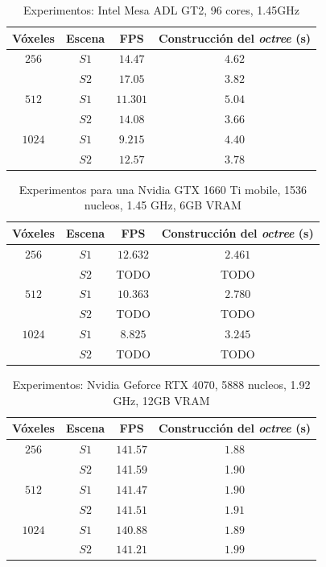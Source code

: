 \begin{table}[ht]
\centering
\begin{tabular}{|c|c|c|c|}
	\hline
	\textbf{Vóxeles} & \textbf{Escena} & \textbf{FPS} & \textbf{Construcción del \textit{octree} (s)} \\
	\hline
	$256$ & $S1$ & $14.47$ & $4.62$ \\
	 & $S2$ & $17.05$ & $3.82$ \\
	\hline
	$512$ & $S1$ & $11.301$ & $5.04$ \\
	 & $S2$ & $14.08$ & $3.66$ \\
	\hline
	$1024$ & $S1$ & $9.215$ & $4.40$ \\
	 & $S2$ & $12.57$ & $3.78$ \\
	\hline
\end{tabular}
\caption{Experimentos: Intel Mesa ADL GT2, 96 cores, 1.45GHz}
\label{tab:cisco-laptop}
\end{table}

\begin{table}[hb]
\centering
\begin{tabular}{|c|c|c|c|}
	\hline
	\textbf{Vóxeles} & \textbf{Escena} & \textbf{FPS} & \textbf{Construcción del \textit{octree} (s)} \\
	\hline
	$256$ & $S1$ & $12.632$ & $2.461$ \\
	 & $S2$ & TODO & TODO \\
	\hline
	$512$ & $S1$ & $10.363$ & $2.780$ \\
	 & $S2$ & TODO & TODO \\
	\hline
	$1024$ & $S1$ & $8.825$ & $3.245$ \\
	 & $S2$ & TODO & TODO \\
	\hline
\end{tabular}
\caption{Experimentos para una Nvidia GTX 1660 Ti mobile, 1536 nucleos, 1.45 GHz, 6GB VRAM}
\label{tab:pizzo-laptop}
\end{table}

\begin{table}[hb]
\centering
\begin{tabular}{|c|c|c|c|}
	\hline
	\textbf{Vóxeles} & \textbf{Escena} & \textbf{FPS} & \textbf{Construcción del \textit{octree} (s)} \\
	\hline
	$256$ & $S1$ & $141.57$ & $1.88$ \\
	 & $S2$ & 141.59 & 1.90 \\
	\hline
	$512$ & $S1$ & $141.47$ & $1.90$ \\
	 & $S2$ & $141.51$ & $1.91$ \\
	\hline
	$1024$ & $S1$ & $140.88$ & $1.89$ \\
	 & $S2$ & $141.21$ & $1.99$ \\
	\hline
\end{tabular}
\caption{Experimentos: Nvidia Geforce RTX 4070, 5888 nucleos, 1.92 GHz, 12GB VRAM}
\label{tab:pizzo-desktop}
\end{table}

